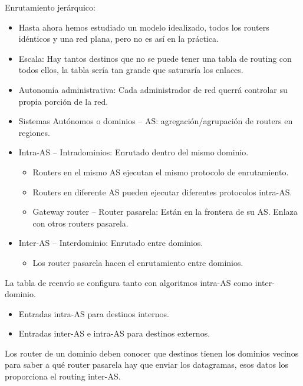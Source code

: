 \documentclass[12pt, twoside, openright]{report} %
\begin{document}
Enrutamiento jerárquico:

\begin{itemize}
	\item Hasta ahora hemos estudiado un modelo idealizado, todos los
	      routers idénticos y una red plana, pero no es así en la práctica.
	\item Escala: Hay tantos destinos que no se puede tener una tabla de
	      routing con todos ellos, la tabla sería tan grande que saturaría
	      los enlaces.
	\item Autonomía administrativa: Cada administrador de red querrá
	      controlar su propia porción de la red.
	\item Sistemas Autónomos o dominios -- AS: agregación/agrupación de
	      routers en regiones.
	\item Intra-AS -- Intradominios: Enrutado dentro del mismo dominio.

	      \begin{itemize}
		      \item Routers en el mismo AS ejecutan el mismo protocolo de
		            enrutamiento.
		      \item Routers en diferente AS pueden ejecutar diferentes protocolos
		            intra-AS.
		      \item Gateway router -- Router pasarela: Están en la frontera de su
		            AS. Enlaza con otros routers pasarela.
	      \end{itemize}
	\item Inter-AS -- Interdominio: Enrutado entre dominios.

	      \begin{itemize}
		      \item Los router pasarela hacen el enrutamiento entre dominios.
	      \end{itemize}
\end{itemize}

La tabla de reenvío se configura tanto con algoritmos intra-AS como
inter-dominio.

\begin{itemize}
	\item Entradas intra-AS para destinos internos.
	\item Entradas inter-AS e intra-AS para destinos externos.
\end{itemize}

Los router de un dominio deben conocer que destinos tienen los
dominios vecinos para saber a qué router pasarela hay que enviar los
datagramas, esos datos los proporciona el routing inter-AS.
\end{document}
